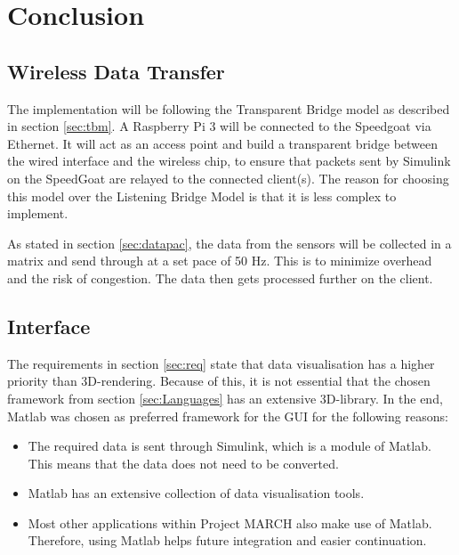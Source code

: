 \section{Conclusion}\label{sec:rescon}
\subsection{Wireless Data Transfer}
The implementation will be following the Transparent Bridge model as described in section \ref{sec:tbm}. A Raspberry Pi 3 will be connected to the Speedgoat via Ethernet. It will act as an access point and build a transparent bridge between the wired interface and the wireless chip, to ensure that packets sent by Simulink on the SpeedGoat are relayed to the connected client(s). The reason for choosing this model over the Listening Bridge Model is that it is less complex to implement. 

As stated in section \ref{sec:datapac}, the data from the sensors will be collected in a matrix and send through at a set pace of 50 Hz. This is to minimize overhead and the risk of congestion. The data then gets processed further on the client.
\subsection{Interface}
The requirements in section \ref{sec:req} state that data visualisation has a higher priority than 3D-rendering. Because of this, it is not essential that the chosen framework from section \ref{sec:Languages} has an extensive 3D-library. In the end, Matlab was chosen as preferred framework for the GUI for the following reasons:
\begin{itemize}
	\item The required data is sent through Simulink, which is a module of Matlab. This means that the data does not need to be converted.
	\item Matlab has an extensive collection of data visualisation tools.
	\item Most other applications within Project MARCH also make use of Matlab. Therefore, using Matlab helps future integration and easier continuation.
\end{itemize}
